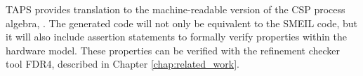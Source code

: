TAPS provides translation to the machine-readable version of the CSP process algebra, \cspm{}. The generated \cspm{} code will not only be equivalent to the SMEIL code, but it will also include assertion statements to formally verify properties within the hardware model. These properties can be verified with the \cspm{} refinement checker tool FDR4, described in Chapter \ref{chap:related_work}.
